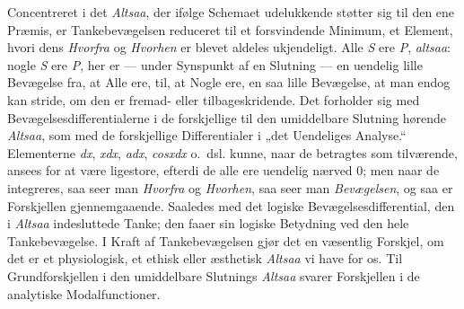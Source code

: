 \documentclass[12pt]{book}
\newcommand{\opage}[1]{\marginnote{\footnotesize\textit{[#1]}}}
\begin{document}
Concentreret i det \emph{Altsaa}, der ifølge Schemaet udelukkende støtter sig til den ene Præmis, er Tankebevægelsen reduceret til et forsvindende Minimum, et Element, hvori dens \emph{Hvorfra} og \emph{Hvorhen} er blevet aldeles ukjendeligt. Alle \textit{S} ere \textit{P}, \emph{altsaa}: nogle \textit{S} ere \textit{P}, her er --- under Synspunkt af en Slutning --- en uendelig lille Bevægelse fra, at Alle ere, til, at Nogle ere, en saa lille Bevægelse, at man endog kan stride, om den er fremad- eller tilbageskridende. Det forholder sig med Bevægelsesdifferentialerne i de forskjellige til den umiddelbare Slutning hørende \emph{Altsaa}, som med de forskjellige Differentialer i „det Uendeliges Analyse.“ Elementerne \textit{dx}, \textit{xdx}, \textit{adx}, \textit{cosxdx} o.\ dsl. kunne, naar de betragtes som tilværende, ansees for at være ligestore, efterdi de alle ere uendelig nærved 0; men naar de integreres, saa seer man \emph{Hvorfra} og \emph{Hvorhen}, saa seer man \emph{Bevægelsen}, og saa er Forskjellen gjennemgaaende. Saaledes med det logiske Bevægelsesdifferential, den i \emph{Altsaa} indesluttede Tanke; den faaer sin logiske Betydning ved den hele
\opage{309}Tankebevægelse. I Kraft af Tankebevægelsen gjør det en væsentlig Forskjel, om det er et physiologisk, et ethisk eller æsthetisk \emph{Altsaa} vi have for os. Til Grundforskjellen i den umiddelbare Slutnings \emph{Altsaa} svarer Forskjellen i de analytiske Modalfunctioner.
\end{document}
